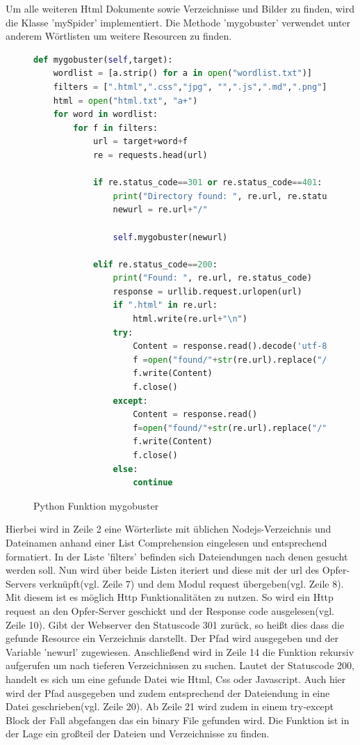 \documentclass[12pt]{article}
\begin{document}
\newpage
Um alle weiteren Html Dokumente sowie Verzeichnisse und Bilder zu finden, wird die Klasse 'mySpider' implementiert. Die Methode 'mygobuster' verwendet unter anderem Wörtlisten um weitere Resourcen zu finden.
\begin{figure}[h]
\caption{Python Funktion mygobuster}
\begin{lstlisting}[language=python, style=Code]
def mygobuster(self,target):
	wordlist = [a.strip() for a in open("wordlist.txt")]
	filters = [".html",".css","jpg", "",".js",".md",".png"]
	html = open("html.txt", "a+") 
	for word in wordlist:
		for f in filters:
			url = target+word+f
			re = requests.head(url)
		
			if re.status_code==301 or re.status_code==401:
				print("Directory found: ", re.url, re.status_code)
				newurl = re.url+"/"
			
				self.mygobuster(newurl)
			
			elif re.status_code==200:
				print("Found: ", re.url, re.status_code)
				response = urllib.request.urlopen(url)
				if ".html" in re.url:
					html.write(re.url+"\n")
				try:
					Content = response.read().decode('utf-8')
					f =open("found/"+str(re.url).replace("/",""), 'w+')
					f.write(Content)
					f.close()
				except:
					Content = response.read()
					f=open("found/"+str(re.url).replace("/",""), 'wb+')
					f.write(Content)
					f.close()
				else:
					continue
\end{lstlisting}
\end{figure}

Hierbei wird in Zeile 2 eine Wörterliste mit üblichen Nodejs-Verzeichnis und Dateinamen anhand einer List Comprehension eingelesen und entsprechend formatiert.
In der Liste 'filters' befinden sich Dateiendungen nach denen gesucht werden soll. Nun wird über beide Listen iteriert und diese mit der url des Opfer-Servers verknüpft(vgl. Zeile 7) und dem Modul request übergeben(vgl. Zeile 8). Mit diesem ist es möglich Http Funktionalitäten zu nutzen. So wird ein Http request an den Opfer-Server geschickt und der Response code ausgelesen(vgl. Zeile 10). Gibt der Webserver den Statuscode 301 zurück, so heißt dies dass die gefunde Resource ein Verzeichnis darstellt. Der Pfad wird ausgegeben und der Variable 'newurl' zugewiesen. Anschließend wird in Zeile 14 die Funktion rekursiv aufgerufen um nach tieferen Verzeichnissen zu suchen. Lautet der Statuscode 200, handelt es sich um eine gefunde Datei wie Html, Css oder Javascript. Auch hier wird der Pfad ausgegeben und zudem entsprechend
 der Dateiendung in eine Datei geschrieben(vgl. Zeile 20). Ab Zeile 21 wird zudem in einem try-except Block der Fall abgefangen das ein binary File gefunden wird.  
Die Funktion ist in der Lage ein großteil der Dateien und Verzeichnisse zu finden. 
\end{document}
